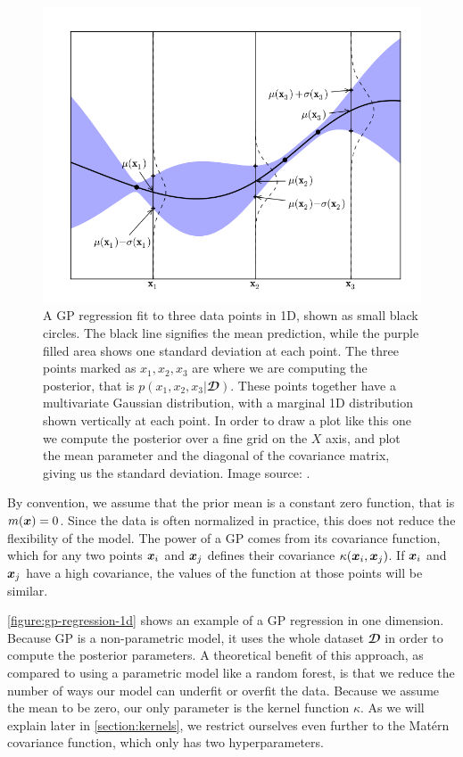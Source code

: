 \begin{figure}
	\begin{center}
		\includegraphics[width=1.0\textwidth]{images/gp-1d.png}
    \caption{A GP regression fit to three data points in 1D, shown as small
    black circles. The black line signifies the mean prediction, while the
    purple filled area shows one standard deviation at each point. The three
    points marked as $x_1, x_2, x_3$ are where we are computing the posterior, that
    is $p(x_1, x_2, x_3 | \mathbfcal{D})$. These points together have a
    multivariate Gaussian distribution, with a marginal 1D distribution shown
    vertically at each point. In order to draw a plot like this one we compute the
    posterior over a fine grid on the $X$ axis, and plot the mean parameter and the
    diagonal of the covariance matrix, giving us the standard deviation. Image
    source: \cite{nando-bopt-tutorial}.}
		\label{figure:gp-regression-1d}
	\end{center}
\end{figure}

By convention, we assume that the prior mean is a constant zero function, that
is $m({\boldsymbol{x}}) = 0$. Since the data is often normalized in practice, this does not
reduce the flexibility of the model. The power of a GP comes from its
covariance function, which for any two points ${\boldsymbol{x}}_i$ and ${\boldsymbol{x}}_j$ defines their
covariance $\kappa({\boldsymbol{x}}_i, {\boldsymbol{x}}_j)$. If ${\boldsymbol{x}}_i$ and ${\boldsymbol{x}}_j$ have a high covariance,
the values of the function at those points will be similar.

\autoref{figure:gp-regression-1d} shows an example of a GP regression in one
dimension. Because GP is a non-parametric model, it uses the whole dataset
$\mathbfcal{D}$ in order to compute the posterior parameters. A theoretical
benefit of this approach, as compared to using a parametric model like a random
forest, is that we reduce the number of ways our model can underfit or overfit
the data. Because we assume the mean to be zero, our only parameter is the
kernel function $\kappa$. As we will explain later in
\autoref{section:kernels}, we restrict ourselves even further to the Mat\'ern
covariance function, which only has two hyperparameters.

